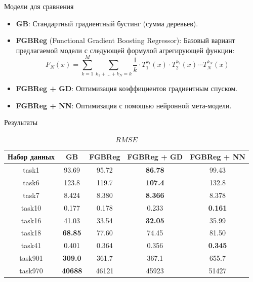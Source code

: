 \documentclass{beamer}
\begin{document}
\begin{frame}{Модели для сравнения}
    \begin{itemize}
        \item \textbf{GB}: Стандартный градиентный бустинг (сумма деревьев).
        \item \textbf{FGBReg} (Functional Gradient Boosting Regressor): Базовый вариант предлагаемой модели с следующей формулой агрегирующей функции:
            \[
                F_N(x) = \sum_{k=1}^{M} \sum_{k_1 + \dots + k_N = k} \frac{1}{k} \cdot T_1^{k_1}(x) \cdot T_2^{k_2}(x) \cdots T_N^{k_N}(x)
            \]
        \item \textbf{FGBReg + GD}: Оптимизация коэффициентов градиентным спуском.
        \item \textbf{FGBReg + NN}: Оптимизация с помощью нейронной мета-модели.
    \end{itemize}
\end{frame}

\begin{frame}{Результаты}

\begin{table}[H]
\centering
\begin{tabular}{|c|c|c|c|c|}
    \hline
     Набор данных & GB              & FGBReg   & FGBReg + GD    & FGBReg + NN     \\
    \hline
    task1         & 93.69           & 95.72   & \textbf{86.78}  & 99.43           \\
    task6         & 123.8           & 119.7   & \textbf{107.4}  & 132.8           \\
    task7         & 8.424           & 8.380   & \textbf{8.366}  & 8.378           \\
    \hline
    task10        & 0.177           & 0.178   & 0.233           & \textbf{0.161}  \\
    task16        & 41.03           & 33.54   & \textbf{32.05}  & 35.99           \\
    task18        & \textbf{68.85}  & 77.60   & 74.45           & 81.50           \\
    \hline
    task41        & 0.401           & 0.364   & 0.356           & \textbf{0.345}  \\
    task901       & \textbf{309.0}  & 361.7   & 367.1           & 655.7           \\
    task970       & \textbf{40688}  & 46121   & 45923           & 51427           \\
    \hline
\end{tabular}
\caption{$RMSE$}
\label{tab:rmse_results}
\end{table}
    
\end{frame}
\end{document}
